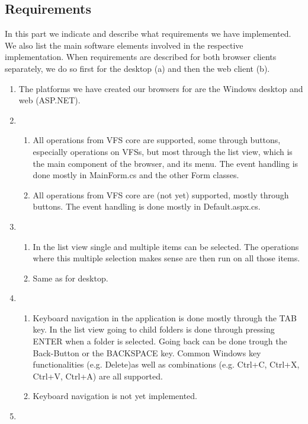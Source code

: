 \documentclass[a4paper,12pt]{article}
\begin{document}
\subsection{Requirements}
In this part we indicate and describe what requirements we have implemented. We also list the main software elements involved in the respective implementation. When requirements are described for both browser clients separately, we do so first for the desktop (a) and then the web client (b).

\begin{enumerate}
	\item The platforms we have created our browsers for are the Windows desktop and web (ASP.NET).
	\item
		\begin{enumerate} [label={(\alph*)}]
		\item All operations from VFS core are supported, some through buttons, especially operations on VFSs, but most through the list view, which is the main component of the browser, and its menu. The event handling is done mostly in MainForm.cs and the other Form classes.
		\item All operations from VFS core are (not yet) supported, mostly through buttons. The event handling is done mostly in\newline 
		Default.aspx.cs.
		\end{enumerate}
	\item
		\begin{enumerate} [label={(\alph*)}]
		\item In the list view single and multiple items can be selected. The operations where this multiple selection makes sense are then run on all those items.
		\item Same as for desktop.
		\end{enumerate}
	\item
		\begin{enumerate} [label={(\alph*)}]
		\item Keyboard navigation in the application is done mostly through the TAB key. In the list view going to child folders is done through pressing ENTER when a folder is selected. Going back can be done trough the Back-Button or the BACKSPACE key. Common Windows key functionalities (e.g. Delete)as well as combinations (e.g. Ctrl+C, Ctrl+X, Ctrl+V, Ctrl+A) are all supported.
		\item Keyboard navigation is not yet implemented.
		\end{enumerate}
	\item

\end{enumerate}
\end{document}
